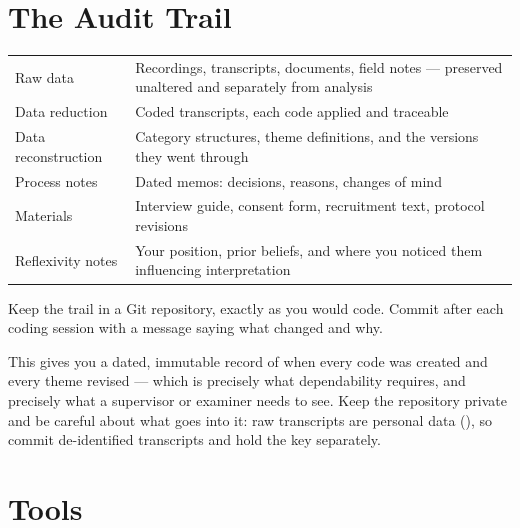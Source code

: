\section{The Audit Trail}

\begin{center}
\small
\begin{tabular}{@{}L{3.4cm}L{10.9cm}@{}}
\toprule
Raw data          & Recordings, transcripts, documents, field notes ---
                    preserved unaltered and separately from analysis \\
Data reduction    & Coded transcripts, each code applied and traceable \\
Data reconstruction & Category structures, theme definitions, and the versions
                    they went through \\
Process notes     & Dated memos: decisions, reasons, changes of mind \\
Materials         & Interview guide, consent form, recruitment text, protocol
                    revisions \\
Reflexivity notes & Your position, prior beliefs, and where you noticed them
                    influencing interpretation \\
\bottomrule
\end{tabular}
\end{center}

\begin{alertbox}
Keep the trail in a Git repository, exactly as you would code. Commit after
each coding session with a message saying what changed and why.

\medskip
This gives you a dated, immutable record of when every code was created and
every theme revised --- which is precisely what dependability requires, and
precisely what a supervisor or examiner needs to see. Keep the repository
private and be careful about what goes into it: raw transcripts are personal
data (), so commit de-identified transcripts and hold the key
separately.
\end{alertbox}

\section{Tools}

